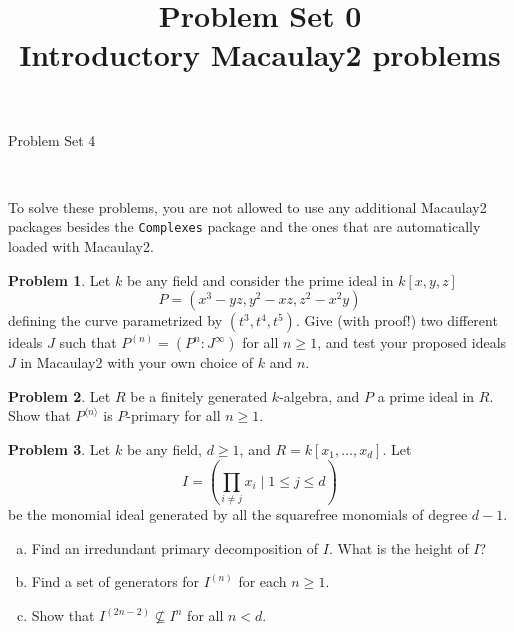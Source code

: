 \documentclass[11pt]{article}
\title{}
\date{\vspace{-0.5in}}
\title{Problem Set 0 \\ Introductory Macaulay2 problems}
\theoremstyle{definition}
\newtheorem{problem}{Problem}
\begin{document}
\thispagestyle{fancy}
\pagestyle{fancy}


\begin{center}
	{\LARGE Problem Set 4\\
	
	
}
\end{center}

\

To solve these problems, you are not allowed to use any additional Macaulay2 packages besides the \texttt{Complexes} package and the ones that are automatically loaded with Macaulay2.


\begin{problem}
	Let $k$ be any field and consider the prime ideal in $k[x,y,z]$
	$$P = (x^3-yz,y^2-xz,z^2-x^2y)$$
	defining the curve parametrized by $(t^3, t^4, t^5)$. Give (with proof!) two different ideals $J$ such that $P^{(n)} = (P^n : J^\infty)$ for all $n \geqslant 1$, and test your proposed ideals $J$ in Macaulay2 with your own choice of $k$ and $n$.
\end{problem}


\begin{problem}
	Let $R$ be a finitely generated $k$-algebra, and $P$ a prime ideal in $R$. Show that $P^{\langle n\rangle}$ is $P$-primary for all $n \geqslant 1$.
\end{problem}



\begin{problem}
	Let $k$ be any field, $d \geqslant 1$, and $R = k[x_1, \ldots, x_d]$. Let
	$$I = \left( \prod_{i \neq j} x_{i} \mid 1 \leqslant j \leqslant d \right)$$
	be the monomial ideal generated by all the squarefree monomials of degree $d-1$. 
	\begin{enumerate}[a)]
		\item Find an irredundant primary decomposition of $I$. What is the height of $I$?
		\item Find a set of generators for $I^{(n)}$ for each $n \geqslant 1$.
		\item Show that $I^{(2n-2)} \nsubseteq I^n$ for all $n < d$.
	\end{enumerate}
\end{problem}
\end{document}
